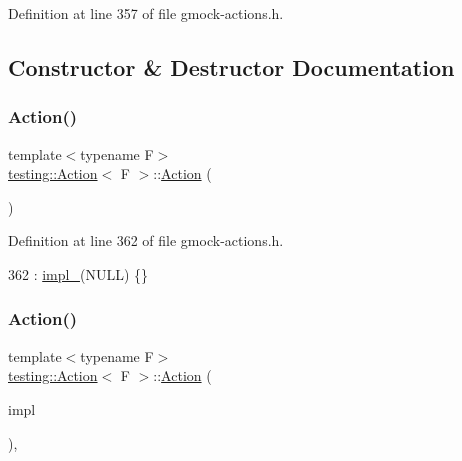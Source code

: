 Definition at line 357 of file gmock-\/actions.\+h.



\subsection{Constructor \& Destructor Documentation}
\mbox{\label{classtesting_1_1Action_a967772922a39dd7098bee429d749f277}} 
\subsubsection{\texorpdfstring{Action()}{Action()}\hspace{0.1cm}{\footnotesize\ttfamily [1/5]}}
{\footnotesize\ttfamily template$<$typename F$>$ \\
\hyperlink{classtesting_1_1Action}{testing\+::\+Action}$<$ F $>$\+::\hyperlink{classtesting_1_1Action}{Action} (\begin{DoxyParamCaption}{ }\end{DoxyParamCaption})\hspace{0.3cm}{\ttfamily [inline]}}



Definition at line 362 of file gmock-\/actions.\+h.


\begin{DoxyCode}
362 : \hyperlink{classtesting_1_1Action_a878cb86f5126a22b5c6d5d8fb919f5d9}{impl\_}(NULL) \{\}
\end{DoxyCode}
\mbox{\label{classtesting_1_1Action_a5ce44c673e3f91378777b954d88917cd}} 
\subsubsection{\texorpdfstring{Action()}{Action()}\hspace{0.1cm}{\footnotesize\ttfamily [2/5]}}
{\footnotesize\ttfamily template$<$typename F$>$ \\
\hyperlink{classtesting_1_1Action}{testing\+::\+Action}$<$ F $>$\+::\hyperlink{classtesting_1_1Action}{Action} (\begin{DoxyParamCaption}\item[{\hyperlink{classtesting_1_1ActionInterface}{Action\+Interface}$<$ F $>$ $\ast$}]{impl }\end{DoxyParamCaption})\hspace{0.3cm}{\ttfamily [inline]}, {\ttfamily [explicit]}}



